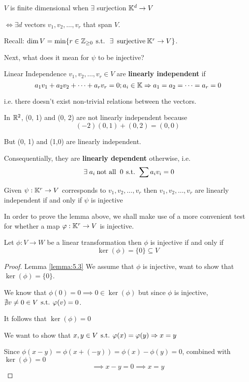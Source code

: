 \begin{remark}
    \(V\) is finite dimensional when \(\exists\) surjection \(\mathbb{K}^d \to V\)

    \(\Leftrightarrow \exists d\) vectors \(v_1, v_2, \dots, v_r\) that span \(V\).

    Recall: \(\dim V = \min\{r \in \bbz_{\geq 0} \st \exists \:\text{surjective}\: \bbk^r \to V\}\).

    Next, what does it mean for \(\psi\) to be injective?
\end{remark}

\begin{definition} {Linear Independence}
    \(v_1, v_2, \dots, v_r \in V\) are \textbf{linearly independent} if \[
        a_1v_1 + a_2v_2 + \cdots + a_rv_r = 0; a_i \in \mathbb{K} \Rightarrow a_1 = a_2 = \cdots = a_r = 0
    \]

    i.e. there doesn't exist non-trivial relations between the vectors.
\end{definition}

\begin{example}
    In \(\mathbb{R}^2\), (0, 1) and (0, 2) are not linearly independent because \[
        (-2) (0, 1) + (0, 2) = (0, 0)
    \]

    But (0, 1) and (1,0) are linearly independent.
\end{example}

Consequentially, they are \textbf{linearly dependent} otherwise, i.e. \[
    \exists a_i \:\text{not all }\: 0 \st \sum a_iv_i = 0
\]
\begin{lemma} \label{lemma:5.2}
    Given \(\psi: \mathbb{K}^r \to V\) corresponds to \(v_1, v_2, \dots, v_r\) then \(v_1, v_2, \dots, v_r\) are linearly independent if and only if \(\psi\) is injective
\end{lemma}


In order to prove the lemma above, we shall make use of a more convenient test for whether a map \(\varphi: \mathbb{K}^r \to V\) is injective.

\begin{lemma} \label{lemma:5.3}
    Let \(\phi: V \to W\) be a linear transformation then \(\phi\) is injective if and only if \[
        \ker(\phi) = \{0\} \subseteq V
    \]
\end{lemma}

\begin{proof} {Lemma \ref{lemma:5.3}}
    \pffwd We assume that \(\phi\) is injective, want to show that \(\ker(\phi) = \{0\}\).

    We know that \(\phi(0) = 0 \implies 0 \in \ker(\phi) \) but since \(\phi\) is injective, \(\nexists v \neq 0 \in V \hspace*{4pt}\text{s.t.}\hspace*{4pt} \varphi(v) = 0\).

    It follows that \(\ker(\phi) = {0}\)

    \pfbwd We want to show that \(x, y \in V \hspace*{4pt}\text{s.t.}\hspace*{4pt} \varphi(x) = \varphi(y) \Rightarrow x = y\)

    Since \(\phi(x-y)  = \phi(x + (-y)) = \phi(x) - \phi(y) = 0\), combined with \(\ker(\phi) = {0}\) \[
        \implies x - y = 0 \implies x =y
    \]
\end{proof}

